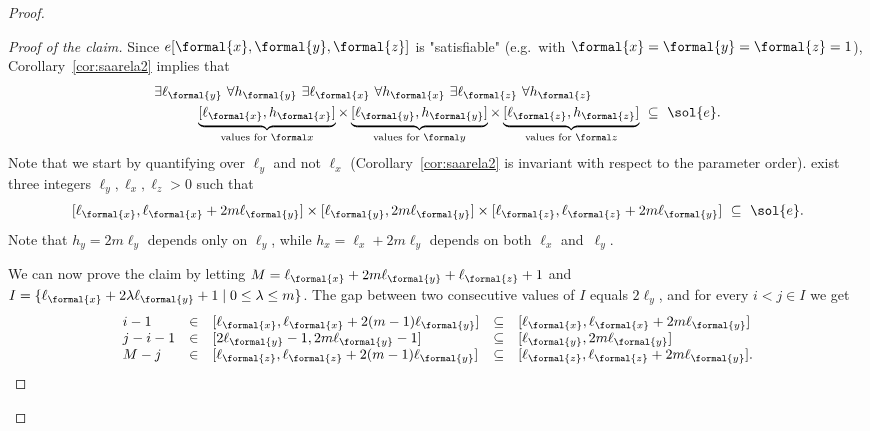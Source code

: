 \documentclass{theoretics}
\begin{document}
\begin{proof}
\begin{proof}[Proof of the claim]
Since $e[\formal{x}, \formal{y}, \formal{z}]$ is "satisfiable" (e.g.~with
$\formal{x}=\formal{y}=\formal{z}=1$), Corollary~\ref{cor:saarela2}
implies that
\[
\begin{aligned}
  & \exists \ell_{\formal{y}} ~ \forall h_{\formal{y}} ~ 
  \exists \ell_{\formal{x}} ~ \forall h_{\formal{x}} ~ 
  \exists \ell_{\formal{z}} ~ \forall h_{\formal{z}} \\
  &\qquad\quad
  \underbrace{[\ell_{\formal{x}},h_{\formal{x}}]}_{\text{values for }\formal x} \times
  \underbrace{[\ell_{\formal{y}},h_{\formal{y}}]}_{\text{values for }\formal y} \times
  \underbrace{[\ell_{\formal{z}},h_{\formal{z}}]}_{\text{values for }\formal z} 
  ~\subseteq~ \sol{e}.
\end{aligned}
\]
Note that we start by quantifying over $\ell_y$ and not $\ell_x$
(Corollary~\ref{cor:saarela2} is invariant with respect to the
parameter order). %
exist three integers $\ell_y,\ell_x,\ell_z>0$ such that 
\begin{equation}\label{equ:solutionXYZ}
[\ell_{\formal{x}}, \ell_{\formal{x}} + 2m\ell_{\formal{y}}] \times
[\ell_{\formal{y}}, 2m \ell_{\formal{y}}] \times
[\ell_{\formal{z}}, \ell_{\formal{z}} + 2m \ell_{\formal{y}}]
  ~\subseteq~ \sol{e}.
\end{equation}
Note that $h_y = 2m\ell_y$ depends only on $\ell_y$, while
$h_x=\ell_x+2m\ell_y$ depends on both $\ell_x$ and~$\ell_y$. 

We can now prove the claim by letting 
$M = \ell_{\formal{x}} + 2m\ell_{\formal{y}} + \ell_{\formal{z}} + 1$ and 
$I = \{\ell_{\formal{x}} + 2\lambda\ell_{\formal{y}} + 1 \mid 0 \leq \lambda \leq m\}$.
The gap between two consecutive values of $I$ equals $2\ell_y$,
and for every $i < j\in I$ we get
\[
\begin{array}{lllll}
    i-1 & \in &
  [\ell_{\formal{x}},\ell_{\formal{x}}+2(m-1)\ell_{\formal{y}}] & \subseteq &
  [\ell_{\formal{x}}, \ell_{\formal{x}} + 2m\ell_{\formal{y}}] \\
  j-i-1 & \in & [2\ell_{\formal{y}}-1,2m\ell_{\formal{y}}-1] & \subseteq &
  [\ell_{\formal{y}},2m\ell_{\formal{y}}] \\
  M-j & \in &
  [\ell_{\formal{z}}, \ell_{\formal{z}} + 2(m-1)\ell_{\formal{y}}] & \subseteq &
  [\ell_{\formal{z}}, \ell_{\formal{z}} + 2m \ell_{\formal{y}}].
\end{array}
\]


\end{proof}
\end{proof}
\end{document}
